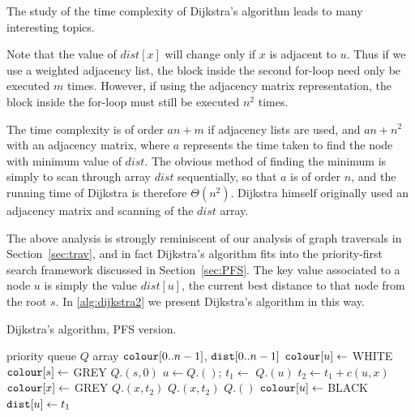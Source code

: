 The study of the time complexity of Dijkstra's algorithm leads to many
interesting topics.

Note that the value of $dist[x]$ will change only if $x$ is adjacent to
$u$. Thus if we use a weighted adjacency list, the block inside the
second for-loop need only be executed $m$ times. However, if
using the adjacency matrix representation, the block inside the for-loop
must still be executed $n^2$ times.

The time complexity is of order $a n + m$ if adjacency lists are used,
and $a n + n^2$ with an adjacency matrix, where $a$ represents the time
taken to find the node with minimum value of $dist$. The obvious method
of finding the minimum is simply to scan through array $dist$
sequentially, so that $a$ is of order $n$, and the running time of
Dijkstra is therefore $\Theta(n^2)$. Dijkstra himself originally used
an adjacency matrix and scanning of the $dist$ array. 

The above analysis is strongly reminiscent of our analysis of graph
traversals in Section~\ref{sec:trav}, and in fact Dijkstra's algorithm fits
into the priority-first search framework discussed in
Section~\ref{sec:PFS}. The key value associated to a node $u$ is simply the
value $dist[u]$, the current best distance to that node from the root $s$.
In \cref{alg:dijkstra2} we present Dijkstra's algorithm in this
way.


\begin{algorithm}[H]
  \caption{Dijkstra's algorithm, PFS version.}
  \label{alg:dijkstra2}
\begin{algorithmic}[1]
	\State priority queue $Q$
	\State array $\colour[0..n-1]$, $\dist[0..n-1]$
		\State $\colour[u] \gets$ WHITE 
	\EndFor
	\State $\colour[s] \gets $ GREY
	\State $Q$.$(s, 0)$
		\State $u \gets Q$.$()$; $t_1 \gets$  $Q$.$(u)$
			\State $t_2 \gets t_1 + c(u, x)$
				\State $\colour[x] \gets $ GREY
				\State $Q$.$(x, t_2)$
				\State $Q$.$(x, t_2)$
			\EndIf
		\EndFor
		\State $Q$.$()$
		\State $\colour[u] \gets $ BLACK
		\State $\dist[u] \gets t_1$ 
	\EndWhile
	\State \Return{$\dist$}
\EndFunction
\end{algorithmic}
\end{algorithm}


